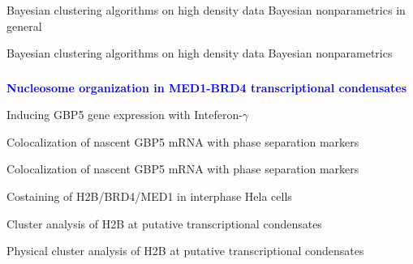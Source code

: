 \documentclass{beamer}					%
\begin{document}
\begin{frame}{Bayesian clustering algorithms on high density data}
Bayesian nonparametrics in general
\end{frame}

\begin{frame}{Bayesian clustering algorithms on high density data}
Bayesian nonparametrics
\end{frame}

\begin{frame}
\frametitle{}
\centering
\Large \textbf{\textcolor{blue}{Nucleosome organization in MED1-BRD4 transcriptional condensates}}
\end{frame}

\begin{frame}{Inducing GBP5 gene expression with Inteferon-$\gamma$}
\end{frame}

\begin{frame}{Colocalization of nascent GBP5 mRNA with phase separation markers}
\end{frame}

\begin{frame}{Colocalization of nascent GBP5 mRNA with phase separation markers}
\end{frame}

\begin{frame}{Costaining of H2B/BRD4/MED1 in interphase Hela cells}
\end{frame}

\begin{frame}{Cluster analysis of H2B at putative transcriptional condensates}
\end{frame}

\begin{frame}{Physical cluster analysis of H2B at putative transcriptional condensates}
\end{frame}
\end{document}
